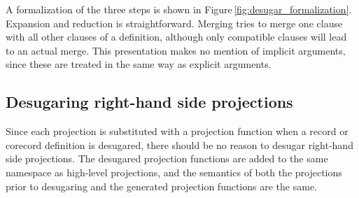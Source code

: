 A formalization of the three steps is shown in Figure\,\ref{fig:desugar_formalization}. Expansion and reduction is straightforward. Merging tries to merge one clause with all other clauses of a definition, although only compatible clauses will lead to an actual merge. This presentation makes no mention of implicit arguments, since these are treated in the same way as explicit arguments.




\subsection{Desugaring right-hand side projections}
Since each projection is substituted with a projection function when a record or corecord definition is desugared, there should be no reason to desugar right-hand side projections. The desugared projection functions are added to the same namespace as high-level projections, and the semantics of both the projections prior to desugaring and the generated projection functions are the same.

